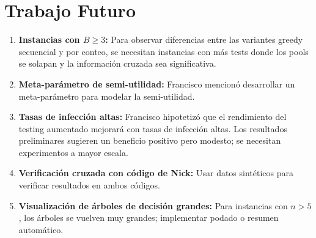 \documentclass[11pt, a4paper]{article}
\begin{document}
\section{Trabajo Futuro}

\begin{enumerate}[nosep]
    \item \textbf{Instancias con $B \geq 3$:} Para observar diferencias entre
    las variantes greedy secuencial y por conteo, se necesitan instancias con
    m\'as tests donde los pools se solapan y la informaci\'on cruzada sea
    significativa.

    \item \textbf{Meta-par\'ametro de semi-utilidad:} Francisco mencion\'o
    desarrollar un meta-par\'ametro para modelar la semi-utilidad.

    \item \textbf{Tasas de infecci\'on altas:} Francisco hipotetiz\'o que el
    rendimiento del testing aumentado mejorar\'a con tasas de infecci\'on
    altas. Los resultados preliminares sugieren un beneficio positivo pero
    modesto; se necesitan experimentos a mayor escala.

    \item \textbf{Verificaci\'on cruzada con c\'odigo de Nick:} Usar datos
    sint\'eticos para verificar resultados en ambos c\'odigos.

    \item \textbf{Visualizaci\'on de \'arboles de decisi\'on grandes:} Para
    instancias con $n > 5$, los \'arboles se vuelven muy grandes;
    implementar podado o resumen autom\'atico.
\end{enumerate}
\end{document}
